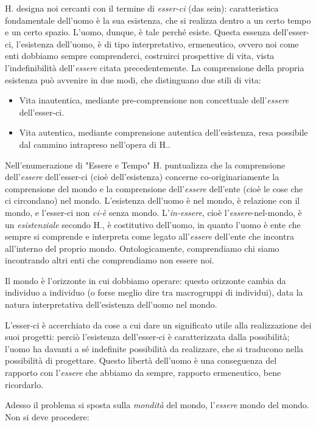 \documentclass[a4paper,12pt,oneside]{article}%
\begin{document}
H. designa noi cercanti con il termine di \textit{esser-ci} (das sein): caratteristica fondamentale dell’uomo è la sua esistenza, che si realizza dentro a un certo tempo e un certo spazio. L’uomo, dunque, è tale perché esiste. Questa essenza dell'esser-ci, l'esistenza dell'uomo, è di tipo interpretativo, ermeneutico, ovvero noi come enti dobbiamo sempre comprenderci, costruirci prospettive di vita, vista l'indefinibilità dell'\textit{essere} citata precedentemente. La comprensione della propria esistenza può avvenire in due modi, che distinguano due stili di vita:

\begin{itemize}
	\item Vita inautentica, mediante pre-comprensione non concettuale dell'\textit{essere} dell'esser-ci.
	\item Vita autentica, mediante comprensione autentica dell'esistenza, resa possibile dal cammino intrapreso nell'opera di H..
\end{itemize} 
	
Nell'enumerazione di "Essere e Tempo" H. puntualizza che la comprensione dell'\textit{essere} dell'esser-ci (cioè dell'esistenza) concerne co-originariamente la comprensione del mondo e la comprensione dell'\textit{essere} dell'ente (cioè le cose che ci circondano) nel mondo. L'esistenza dell'uomo è nel mondo, è relazione con il mondo, e l'esser-ci non \textit{ci-è} senza mondo. L'\textit{in-essere}, cioè l'\textit{essere}-nel-mondo, è un \textit{esistenziale} secondo H., è costitutivo dell'uomo, in quanto l'uomo è ente che sempre si comprende e interpreta come legato all'\textit{essere} dell'ente che incontra all'interno del proprio mondo. Ontologicamente, comprendiamo chi siamo incontrando altri enti che comprendiamo non essere noi.

Il mondo è l'orizzonte in cui dobbiamo operare: questo orizzonte cambia da individuo a individuo (o forse meglio dire tra macrogruppi di individui), data la natura interpretativa dell'esistenza dell'uomo nel mondo.

L’esser-ci è accerchiato da cose a cui dare un significato utile alla realizzazione dei suoi progetti: perciò l’esistenza dell’esser-ci è caratterizzata dalla possibilità; l’uomo ha davanti a sé indefinite possibilità da realizzare, che si traducono nella possibilità di progettare. Questo libertà dell'uomo è una conseguenza del rapporto con l'\textit{essere} che abbiamo da sempre, rapporto ermeneutico, bene ricordarlo.

Adesso il problema si sposta sulla \textit{mondità} del mondo, l'\textit{essere} mondo del mondo. Non si deve procedere:
\end{document}
